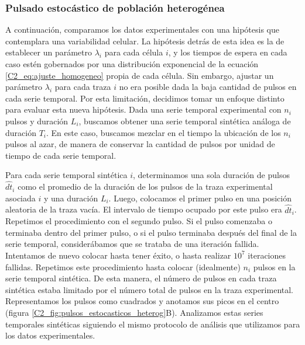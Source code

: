 \documentclass[./main.tex]{subfiles}
\begin{document}
\subsubsection*{Pulsado estocástico de población heterogénea}

A continuación, comparamos los datos experimentales con una hipótesis que contemplara una variabilidad celular. La hipótesis detrás de esta idea es la de establecer un parámetro $\lambda_i$ para cada célula $i$, y los tiempos de espera en cada caso estén gobernados por una distribución exponencial de la ecuación \ref{C2_eq:ajuste_homogeneo} propia de cada célula. Sin embargo, ajustar un parámetro  $\lambda_i$ para cada traza $i$ no era posible dada la baja cantidad de pulsos en cada serie temporal. Por esta limitación, decidimos tomar un enfoque distinto para evaluar esta nueva hipótesis. Dada una serie temporal experimental con $n_i$ pulsos y duración $L_i$, buscamos obtener una serie temporal sintética análoga de duración $T_i$. En este caso, buscamos mezclar en el tiempo la ubicación de los $n_i$ pulsos al azar, de manera de conservar la cantidad de pulsos por unidad de tiempo de cada serie temporal. 


Para cada serie temporal sintética $i$, determinamos una sola duración de pulsos $\hat{dt}_i$ como el promedio de la duración de los pulsos de la traza experimental asociada $i$ y una duración $L_i$. Luego, colocamos el primer pulso en una posición aleatoria de la traza vacía. El intervalo de tiempo ocupado por este pulso era $\hat{dt}_i$. Repetimos el procedimiento con el segundo pulso. Si el pulso comenzaba o terminaba dentro del primer pulso, o si el pulso terminaba después del final de la serie temporal, considerábamos que se trataba de una iteración fallida. Intentamos de nuevo colocar hasta tener éxito, o hasta realizar $10^{7}$ iteraciones fallidas. Repetimos este procedimiento hasta colocar (idealmente) $n_i$ pulsos en la serie temporal sintética. De esta manera, el número de pulsos en cada traza sintética estaba limitado por el número total de pulsos en la traza experimental. Representamos los pulsos como cuadrados y anotamos sus picos en el centro (figura \ref{C2_fig:pulsos_estocasticos_heterog}B). Analizamos estas series temporales sintéticas siguiendo el mismo protocolo de análisis que utilizamos para los datos experimentales. 
\end{document}
